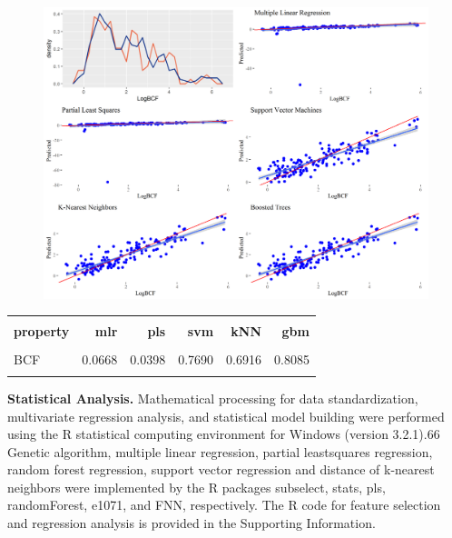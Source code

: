 \documentclass[10pt, letter]{article}
\renewcommand{\=}{\, =\, }
\newcommand{\+}{\, +\, }
\renewcommand{\-}{\, -\, }
\begin{document}
\begin{figure}[H]
  \centering
    \includegraphics[width=1.0\textwidth]{BCF_plots.png}
\end{figure}

\begin{table}[H]
\begin{center}
\begin{tabular}{lrrrrr}
\toprule
&&\\
{\bf property} & {\bf mlr} & {\bf pls} &  {\bf svm}  & {\bf kNN}  & {\bf gbm}\\
\midrule
&&\\
BCF  &   0.0668 & 0.0398 & 0.7690 & 0.6916 & 0.8085\\
&&\\
\midrule
\hline
\end{tabular}
\end{center}
\end{table}

\textbf{Statistical Analysis.} Mathematical processing for data
standardization, multivariate regression analysis, and statistical
model building were performed using the R statistical
computing environment for Windows (version 3.2.1).66
Genetic algorithm, multiple linear regression, partial leastsquares
regression, random forest regression, support vector
regression and distance of k-nearest neighbors were implemented
by the R packages subselect, stats, pls, randomForest,
e1071, and FNN, respectively. The R code for feature selection
and regression analysis is provided in the Supporting
Information.
\end{document}
